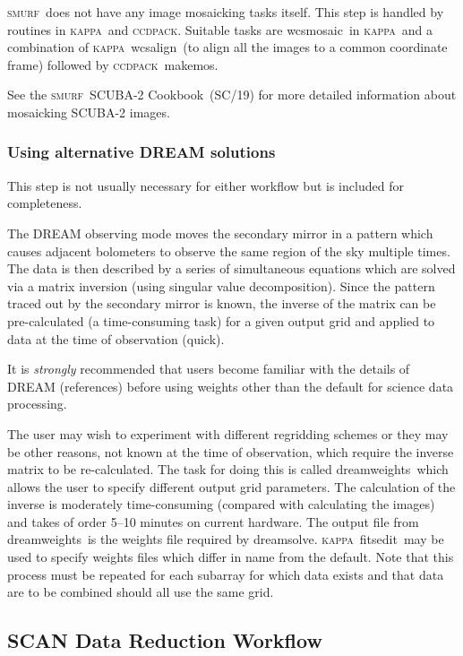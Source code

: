 \documentclass[twoside,11pt]{article}
\newcommand{\xref}[3]{#1}
\newcommand{\xlabel}[1]{}
\renewcommand{\_}{\texttt{\symbol{95}}}
\newcommand{\CCDPACK}{\textsc{ccdpack}}
\newcommand{\KAPPA}{\textsc{kappa}}
\newcommand{\SMURF}{\textsc{smurf}}
\newcommand{\SMURFcook}{\xref{\SMURF\ SCUBA-2 Cookbook}{sc19}{}}
\newcommand{\task}[1]{\textsf{#1}}
\newcommand{\dreamsolve}{\xref{\task{dreamsolve}}{sun258}{DREAMSOLVE}}
\newcommand{\dreamweights}{\xref{\task{dreamweights}}{sun258}{DREAMWEIGHTS}}
\newcommand{\makemos}{\xref{\task{makemos}}{sun139}{MAKEMOS}}
\newcommand{\fitsedit}{\xref{\task{fitsedit}}{sun95}{FITSEDIT}}
\newcommand{\wcsmosaic}{\xref{\task{wcsmosaic}}{sun95}{WCSMOSAIC}}
\newcommand{\wcsalign}{\xref{\task{wcsalign}}{sun95}{WCSALIGN}}
\begin{document}
\SMURF\ does not have any image mosaicking tasks itself. This step is
handled by routines in \KAPPA\ and \CCDPACK. Suitable tasks are
\wcsmosaic\ in \KAPPA\ and a combination of \KAPPA\ \wcsalign\ (to
align all the images to a common coordinate frame) followed by
\CCDPACK\ \makemos.

See the \SMURFcook\ (SC/19) for more detailed information about
mosaicking SCUBA-2 images.

\subsubsection{\xlabel{dream}Using alternative DREAM solutions\label{se:dream}}

This step is not usually necessary for either workflow but is included
for completeness.

The DREAM observing mode moves the secondary mirror in a pattern which
causes adjacent bolometers to observe the same region of the sky
multiple times. The data is then described by a series of simultaneous
equations which are solved via a matrix inversion (using singular
value decomposition). Since the pattern traced out by the secondary
mirror is known, the inverse of the matrix can be pre-calculated (a
time-consuming task) for a given output grid and applied to data at
the time of observation (quick).

It is {\em strongly} recommended that users become familiar with the
details of DREAM (references) before using weights other than the
default for science data processing.

The user may wish to experiment with different regridding schemes or
they may be other reasons, not known at the time of observation, which
require the inverse matrix to be re-calculated. The task for doing
this is called \dreamweights\ which allows the user to specify
different output grid parameters. The calculation of the inverse is
moderately time-consuming (compared with calculating the images) and
takes of order 5--10 minutes on current hardware. The output file from
\dreamweights\ is the weights file required by \dreamsolve. \KAPPA\
\fitsedit\ may be used to specify weights files which differ in name
from the default. Note that this process must be repeated for each
subarray for which data exists and that data are to be combined should
all use the same grid.

\subsection{\xlabel{scanworkflow}SCAN Data Reduction Workflow\label{se:scanworkflow}}
\end{document}
